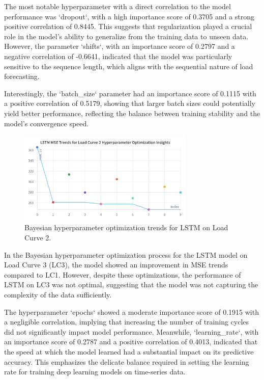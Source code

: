 \documentclass{article} %
\begin{document}
The most notable hyperparameter with a direct correlation to the model performance was `dropout`, with a high importance score of 0.3705 and a strong positive correlation of 0.8445. This suggests that regularization played a crucial role in the model's ability to generalize from the training data to unseen data. However, the parameter `shifts`, with an importance score of 0.2797 and a negative correlation of -0.6641, indicated that the model was particularly sensitive to the sequence length, which aligns with the sequential nature of load forecasting.

Interestingly, the `batch\_size` parameter had an importance score of 0.1115 with a positive correlation of 0.5179, showing that larger batch sizes could potentially yield better performance, reflecting the balance between training stability and the model's convergence speed.


\begin{figure}[H]
    \centering
    \includegraphics[width=0.75\textwidth]{ressources/Hyperparams/LSTM/LSTM MSE Trends for Load Curve 2 Hyperparameter Optimization Insights.png}
    \caption{Bayesian hyperparameter optimization trends for LSTM on Load Curve 2.}
    \label{fig:lstm_lc2}
\end{figure}
In the Bayesian hyperparameter optimization process for the \gls{LSTM} model on Load Curve 3 (\gls{LC3}), the model showed an improvement in \gls{MSE} trends compared to \gls{LC1}. However, despite these optimizations, the performance of \gls{LSTM} on \gls{LC3} was not optimal, suggesting that the model was not capturing the complexity of the data sufficiently.

The hyperparameter `epochs` showed a moderate importance score of 0.1915 with a negligible correlation, implying that increasing the number of training cycles did not significantly impact model performance. Meanwhile, `learning\_rate`, with an importance score of 0.2787 and a positive correlation of 0.4013, indicated that the speed at which the model learned had a substantial impact on its predictive accuracy. This emphasizes the delicate balance required in setting the learning rate for training deep learning models on time-series data.
\end{document}

